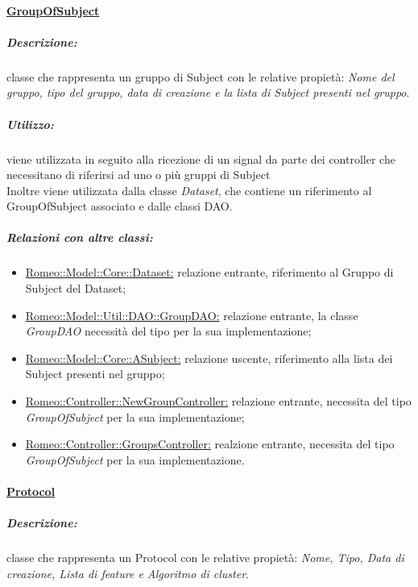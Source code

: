 		\paragraph{\underline{GroupOfSubject}} 
		\label{group}
		
			\subparagraph{Descrizione:} classe che rappresenta un gruppo di Subject\g{} con le relative propietà: \emph{Nome del gruppo, tipo del gruppo, data di creazione e la lista di Subject\g{} presenti nel gruppo}.
			
			\subparagraph{Utilizzo:} viene utilizzata in seguito alla ricezione di un signal\g{} da parte dei controller che necessitano di riferirsi ad uno o più gruppi di Subject\g{}
			\\Inoltre viene utilizzata dalla classe \textsl{Dataset}, che contiene un riferimento al GroupOfSubject\g{} associato e dalle classi DAO.
			
			\subparagraph{Relazioni con altre classi:}
				\begin{itemize}
					\item \hyperref[dataset]{Romeo::Model::Core::Dataset:} relazione entrante, riferimento al Gruppo di Subject\g{} del Dataset\g{};
					
					\item \hyperref[]{Romeo::Model::Util::DAO::GroupDAO:} relazione entrante, la classe \textsl{GroupDAO} necessità del tipo per la sua implementazione;
					
					\item \hyperref[core_asub]{Romeo::Model::Core::ASubject:} relazione uscente, riferimento alla lista dei Subject\g{} presenti nel gruppo;
					
					\item \hyperref[]{Romeo::Controller::NewGroupController:} relazione entrante, necessita del tipo \textsl{GroupOfSubject} per la sua implementazione;
					
					\item \hyperref[]{Romeo::Controller::GroupsController:} realzione entrante, necessita del tipo \textsl{GroupOfSubject} per la sua implementazione.
				\end{itemize}

		\paragraph{\underline{Protocol}} 
		\label{protocol}

			\subparagraph{Descrizione:} classe che rappresenta un Protocol\g{} con le relative propietà: \emph{Nome, Tipo, Data di creazione, Lista di feature\g{} e Algoritmo di cluster\g{}}.
			
